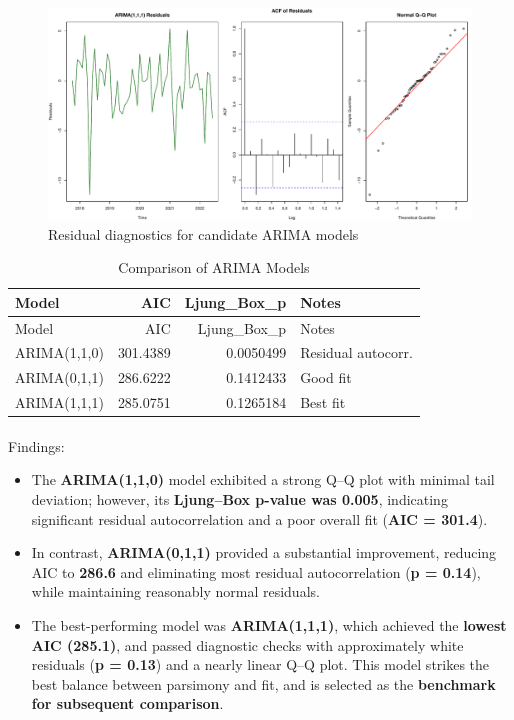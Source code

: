 \documentclass[
  11pt,
]{article}
\makeatletter
\let\oldparagraph\paragraph
\renewcommand{\paragraph}{
    \@ifstar
      \xxxParagraphStar
      \xxxParagraphNoStar
  }
\newcommand{\xxxParagraphStar}[1]{\oldparagraph*{#1}\mbox{}}
\newcommand{\xxxParagraphNoStar}[1]{\oldparagraph{#1}\mbox{}}
\makeatother
\begin{document}
\begin{figure}[H]

{\centering \includegraphics{project_files/figure-pdf/fig-arima-diagnostics-3.pdf}

}

\caption{Residual diagnostics for candidate ARIMA models}

\end{figure}%

\begin{longtable}[]{@{}lrrl@{}}
\caption{Comparison of ARIMA Models}\tabularnewline
\toprule\noalign{}
Model & AIC & Ljung\_Box\_p & Notes \\
\midrule\noalign{}
\endfirsthead
\toprule\noalign{}
Model & AIC & Ljung\_Box\_p & Notes \\
\midrule\noalign{}
\endhead
\bottomrule\noalign{}
\endlastfoot
ARIMA(1,1,0) & 301.4389 & 0.0050499 & Residual autocorr. \\
ARIMA(0,1,1) & 286.6222 & 0.1412433 & Good fit \\
ARIMA(1,1,1) & 285.0751 & 0.1265184 & Best fit \\
\end{longtable}

\paragraph{Findings:}\label{findings}

\begin{itemize}
\item
  The \textbf{ARIMA(1,1,0)} model exhibited a strong Q--Q plot with
  minimal tail deviation; however, its \textbf{Ljung--Box p-value was
  0.005}, indicating significant residual autocorrelation and a poor
  overall fit (\textbf{AIC = 301.4}).
\item
  In contrast, \textbf{ARIMA(0,1,1)} provided a substantial improvement,
  reducing AIC to \textbf{286.6} and eliminating most residual
  autocorrelation (\textbf{p = 0.14}), while maintaining reasonably
  normal residuals.
\item
  The best-performing model was \textbf{ARIMA(1,1,1)}, which achieved
  the \textbf{lowest AIC (285.1)}, and passed diagnostic checks with
  approximately white residuals (\textbf{p = 0.13}) and a nearly linear
  Q--Q plot. This model strikes the best balance between parsimony and
  fit, and is selected as the \textbf{benchmark for subsequent
  comparison}.
\end{itemize}
\end{document}
